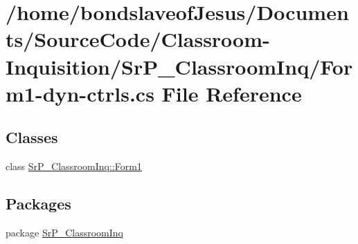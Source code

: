 \hypertarget{_form1-dyn-ctrls_8cs}{
\section{/home/bondslaveof\-Jesus/\-Documents/\-Source\-Code/\-Classroom-\/\-Inquisition/\-Sr\-P\-\_\-\-Classroom\-Inq/\-Form1-\/dyn-\/ctrls.cs \-File \-Reference}
\label{_form1-dyn-ctrls_8cs}
}
\subsection*{\-Classes}
\begin{DoxyCompactItemize}
\item 
class \hyperlink{class_sr_p___classroom_inq_1_1_form1}{\-Sr\-P\-\_\-\-Classroom\-Inq\-::\-Form1}
\end{DoxyCompactItemize}
\subsection*{\-Packages}
\begin{DoxyCompactItemize}
\item 
package \hyperlink{namespace_sr_p___classroom_inq}{\-Sr\-P\-\_\-\-Classroom\-Inq}
\end{DoxyCompactItemize}
